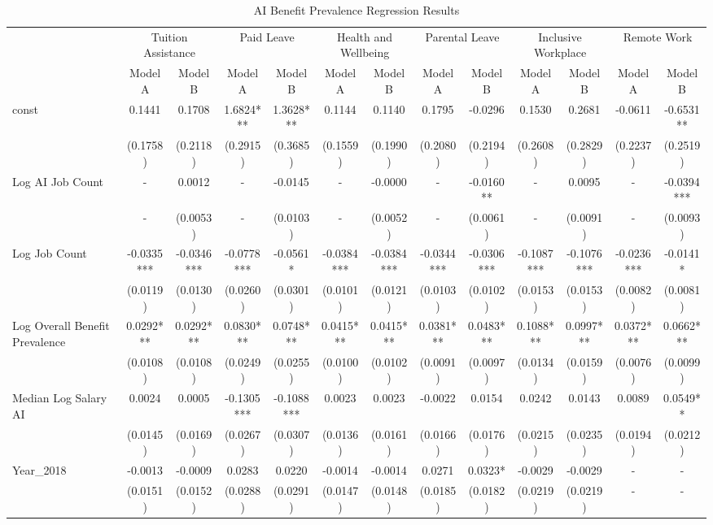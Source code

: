 \begin{table}[htbp]
\centering
\caption{AI Benefit Prevalence Regression Results}
\begin{tabular}{lcccccccccccc}
\hline\hline
 & \multicolumn{2}{c}{Tuition Assistance} & \multicolumn{2}{c}{Paid Leave} & \multicolumn{2}{c}{Health and Wellbeing} & \multicolumn{2}{c}{Parental Leave} & \multicolumn{2}{c}{Inclusive Workplace} & \multicolumn{2}{c}{Remote Work} \\
 & Model A & Model B & Model A & Model B & Model A & Model B & Model A & Model B & Model A & Model B & Model A & Model B \\
\hline
const & 0.1441 & 0.1708 & 1.6824*** & 1.3628*** & 0.1144 & 0.1140 & 0.1795 & -0.0296 & 0.1530 & 0.2681 & -0.0611 & -0.6531** \\
 & (0.1758) & (0.2118) & (0.2915) & (0.3685) & (0.1559) & (0.1990) & (0.2080) & (0.2194) & (0.2608) & (0.2829) & (0.2237) & (0.2519) \\
Log AI Job Count & - & 0.0012 & - & -0.0145 & - & -0.0000 & - & -0.0160** & - & 0.0095 & - & -0.0394*** \\
 & - & (0.0053) & - & (0.0103) & - & (0.0052) & - & (0.0061) & - & (0.0091) & - & (0.0093) \\
Log Job Count & -0.0335*** & -0.0346*** & -0.0778*** & -0.0561* & -0.0384*** & -0.0384*** & -0.0344*** & -0.0306*** & -0.1087*** & -0.1076*** & -0.0236*** & -0.0141* \\
 & (0.0119) & (0.0130) & (0.0260) & (0.0301) & (0.0101) & (0.0121) & (0.0103) & (0.0102) & (0.0153) & (0.0153) & (0.0082) & (0.0081) \\
Log Overall Benefit Prevalence & 0.0292*** & 0.0292*** & 0.0830*** & 0.0748*** & 0.0415*** & 0.0415*** & 0.0381*** & 0.0483*** & 0.1088*** & 0.0997*** & 0.0372*** & 0.0662*** \\
 & (0.0108) & (0.0108) & (0.0249) & (0.0255) & (0.0100) & (0.0102) & (0.0091) & (0.0097) & (0.0134) & (0.0159) & (0.0076) & (0.0099) \\
Median Log Salary AI & 0.0024 & 0.0005 & -0.1305*** & -0.1088*** & 0.0023 & 0.0023 & -0.0022 & 0.0154 & 0.0242 & 0.0143 & 0.0089 & 0.0549** \\
 & (0.0145) & (0.0169) & (0.0267) & (0.0307) & (0.0136) & (0.0161) & (0.0166) & (0.0176) & (0.0215) & (0.0235) & (0.0194) & (0.0212) \\
Year\_2018 & -0.0013 & -0.0009 & 0.0283 & 0.0220 & -0.0014 & -0.0014 & 0.0271 & 0.0323* & -0.0029 & -0.0029 & - & - \\
 & (0.0151) & (0.0152) & (0.0288) & (0.0291) & (0.0147) & (0.0148) & (0.0185) & (0.0182) & (0.0219) & (0.0219) & - & - \\

\end{tabular}
\end{table}
